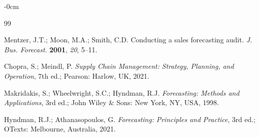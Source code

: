 \documentclass[forecasting,article,submit,pdftex,moreauthors]{Definitions/mdpi}
\begin{document}
\begin{adjustwidth}{-\extralength}{0cm}



% 


\begin{thebibliography}{99}

Mentzer, J.T.; Moon, M.A.; Smith, C.D. Conducting a sales forecasting audit. \textit{J. Bus. Forecast.} \textbf{2001}, \textit{20}, 5--11.

Chopra, S.; Meindl, P. \textit{Supply Chain Management: Strategy, Planning, and Operation}, 7th ed.; Pearson: Harlow, UK, 2021.

Makridakis, S.; Wheelwright, S.C.; Hyndman, R.J. \textit{Forecasting: Methods and Applications}, 3rd ed.; John Wiley \& Sons: New York, NY, USA, 1998.

Hyndman, R.J.; Athanasopoulos, G. \textit{Forecasting: Principles and Practice}, 3rd ed.; OTexts: Melbourne, Australia, 2021.


\end{thebibliography}
\end{adjustwidth}
\end{document}
